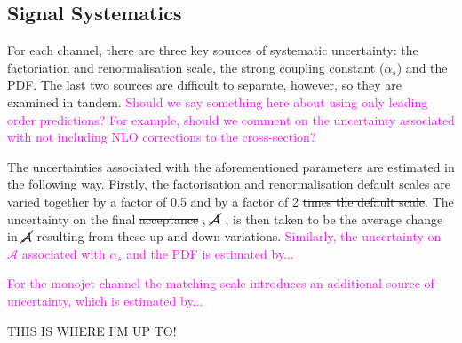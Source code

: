 \subsection{Signal Systematics}
\begin{flushleft}
For each channel, there are three key sources of systematic uncertainty: the factoriation and renormalisation scale, the strong coupling constant ($\alpha_{s}$) and the PDF. The last two sources are difficult to separate, however, so they are examined in tandem. \textcolor{magenta}{Should we say something here about using only leading order predictions? For example, should we comment on the uncertainty associated with not including NLO corrections to the cross-section?} %


\hspace{1cm}The uncertainties associated with the aforementioned parameters are estimated in the following way. Firstly, the factorisation and renormalisation default scales are varied together by a factor of 0.5  and by a factor of 2  \st{times the default scale}. The uncertainty on the final \st{acceptance} , $\cancel{\mathcal{A}}$ , is then taken to be the average change in $\cancel{\mathcal{A}}$  resulting from these up and down variations. \textcolor{magenta}{Similarly, the uncertainty on $\mathcal{A}$ associated with $\alpha_{s}$ and the PDF is estimated by...}

\hspace{1cm}\textcolor{magenta}{For the monojet channel the matching scale introduces an additional source of uncertainty, which is estimated by...}
\bigskip

THIS IS WHERE I'M UP TO!
\end{flushleft}


